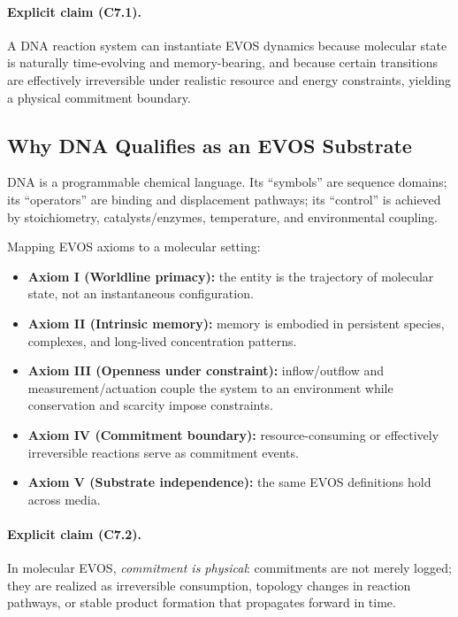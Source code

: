 \documentclass[11pt]{article}
\begin{document}
\paragraph{Explicit claim (C7.1).}
A DNA reaction system can instantiate EVOS dynamics because molecular state is naturally
time-evolving and memory-bearing, and because certain transitions are effectively
irreversible under realistic resource and energy constraints, yielding a physical
commitment boundary.

\subsection{Why DNA Qualifies as an EVOS Substrate}
\label{sec:why-dna-qualifies}

DNA is a programmable chemical language. Its ``symbols'' are sequence domains; its
``operators'' are binding and displacement pathways; its ``control'' is achieved by
stoichiometry, catalysts/enzymes, temperature, and environmental coupling.

Mapping EVOS axioms to a molecular setting:
\begin{itemize}
  \item \textbf{Axiom I (Worldline primacy):} the entity is the trajectory of molecular
        state, not an instantaneous configuration.
  \item \textbf{Axiom II (Intrinsic memory):} memory is embodied in persistent species,
        complexes, and long-lived concentration patterns.
  \item \textbf{Axiom III (Openness under constraint):} inflow/outflow and measurement/actuation
        couple the system to an environment while conservation and scarcity impose constraints.
  \item \textbf{Axiom IV (Commitment boundary):} resource-consuming or effectively irreversible
        reactions serve as commitment events.
  \item \textbf{Axiom V (Substrate independence):} the same EVOS definitions hold across media.
\end{itemize}

\paragraph{Explicit claim (C7.2).}
In molecular EVOS, \emph{commitment is physical}: commitments are not merely logged; they
are realized as irreversible consumption, topology changes in reaction pathways, or
stable product formation that propagates forward in time.
\end{document}

